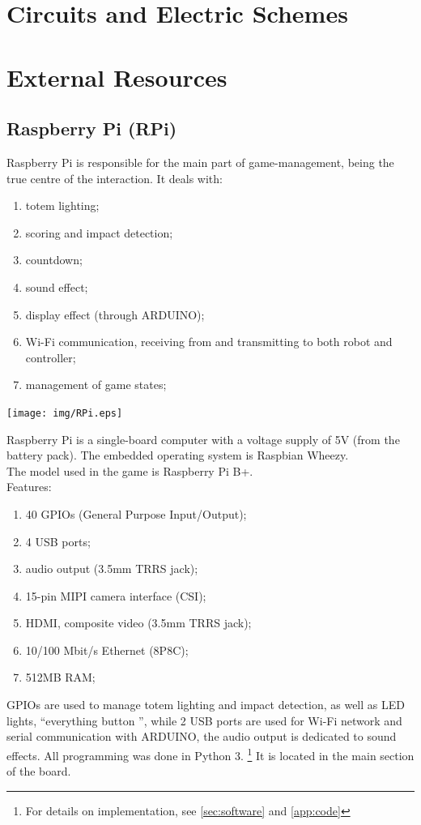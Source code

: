 \documentclass[a4paper,twoside]{book}
\begin{document}
\begin{appendices}

\chapter{Circuits and Electric Schemes}
\label{app:circuit}

\chapter{External Resources}
\label{app:external}

\section{Raspberry Pi (RPi)}
\label{app:RPi}
Raspberry Pi is responsible for the main part of game-management, being the true centre of the interaction. It deals with:
\begin{enumerate}
\item totem lighting;
\item scoring and impact detection;
\item countdown;
\item sound effect;
\item display effect (through ARDUINO);
\item Wi-Fi communication, receiving from and transmitting to both robot and controller;
\item management of game states;
\end {enumerate}

    \texttt{[image: img/RPi.eps]}

Raspberry Pi is a single-board computer with a voltage supply of 5V (from the battery pack). The embedded operating system is Raspbian Wheezy. 
\\
The model used in the game is Raspberry Pi B+.
\\ 
Features:
\begin{enumerate}
\item 40 GPIOs (General Purpose Input/Output);
\item 4 USB ports;
\item audio output (3.5mm TRRS jack);
\item 15-pin MIPI camera interface (CSI);
\item HDMI, composite video (3.5mm TRRS jack);
\item 10/100 Mbit/s Ethernet (8P8C);
\item 512MB RAM;
\end{enumerate}
GPIOs are used to manage totem lighting and impact detection, as well as  LED lights, \textquotedblleft everything button \textquotedblright, while 2 USB ports are used for Wi-Fi network and serial communication with ARDUINO, the audio output is dedicated to sound effects. All programming was done in Python 3.
\footnote {For details on implementation, see \autoref{sec:software} and \autoref{app:code}}
It is located in the main section of the board.


\end{appendices}
\end{document}
